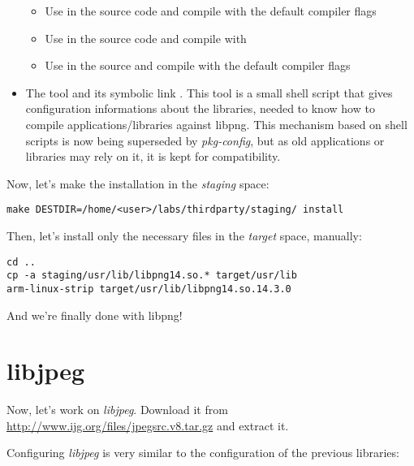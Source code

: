 \begin{itemize}
  \begin{itemize}

  \item Use  in the source code and compile with
    the default compiler flags

  \item Use  in the source code and compile
    with 

  \item Use  in the source and compile
    with the default compiler flags

  \end{itemize}

\item The  tool and its symbolic link
  . This tool is a small shell script
  that gives configuration informations about the libraries, needed to
  know how to compile applications/libraries against libpng. This
  mechanism based on shell scripts is now being superseded by {\em
    pkg-config}, but as old applications or libraries may rely on it,
  it is kept for compatibility.

\end{itemize}

Now, let's make the installation in the {\em staging} space:

\begin{verbatim}
make DESTDIR=/home/<user>/labs/thirdparty/staging/ install
\end{verbatim}

Then, let's install only the necessary files in the {\em target}
space, manually:

\begin{verbatim}
cd ..
cp -a staging/usr/lib/libpng14.so.* target/usr/lib
arm-linux-strip target/usr/lib/libpng14.so.14.3.0
\end{verbatim}

And we're finally done with libpng!

\section{libjpeg}

Now, let's work on {\em libjpeg}. Download it from
\url{http://www.ijg.org/files/jpegsrc.v8.tar.gz} and extract it.

Configuring {\em libjpeg} is very similar to the configuration of the
previous libraries:

